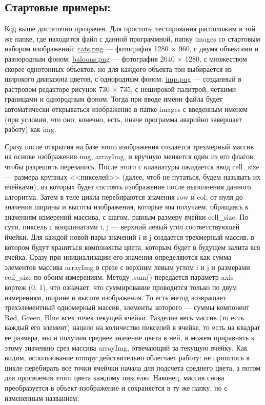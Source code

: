 \documentclass[12pt]{article}
\begin{document}
{	\subsection{Стартовые примеры:}
	\label{base_examples}

	
	
	Код выше достаточно прозрачен. Для простоты тестирования расположим в той же папке, где находится файл с данной программной, папку images со стартовым набором изображений: \hyperref[cats]{cats.png} --- фотография 1280 $\times$ 960, с двумя объектами и разнородным фоном; \hyperref[baloons]{baloons.png} --- фотография 2040 $\times$ 1280, с множеством скорее однотонных объектов, но для каждого объекта тон выбирается из широкого диапазона цветов, с однородным фоном; \hyperref[imp]{imp.png} --- созданный в растровом редакторе рисунок 730 $\times$ 735, с неширокой палитрой, четкими границами и однородным фоном. Тогда при вводе имени файла будет автоматически открываться изображение в папке images с введенным именем (при условии, что оно, конечно, есть, иначе программа аварийно завершает работу) как img.  
	
	Сразу после открытия на базе этого изображения создается трехмерный массив на основе изображения img, arrayImg, и вручную меняется один из его флагов, чтобы разрешить перезапись. После этого с клавиатуры ожидается ввод cell\_size --- размера крупных <<пикселей>> (далее, чтоб не путаться, будем называть их ячейками), из которых будет состоять изображение после выполнения данного алгоритма. Затем в теле цикла перебираются значения row и col, от нуля до значения ширины и высоты изображения, которые мы получаем, обращаясь к значениям измерений массива, с шагом, равным размеру ячейки cell\_size. По сути, пиксель с координатами i, j --- верхний левый угол соответствующей йчейки. Для каждой новой пары значений i и j создается трехмерный массив, в котором будут храниться компоненты цвета, которым будет в будущем залита вся ячейка. Сразу при инициализации его значения определяются как сумма элементов массива arrayImg в срезе с верхним левым углом i и j и размерами cell\_size по обоим измерениям. Методу .sum() передается параметр axis --- кортеж (0, 1), что означает, что суммирование проводится только по двум измерениям, ширине и высоте изображения. То есть метод возвращает трехэлементный одномерный массив, элементы которого --- суммы компонент Red, Green, Blue всех точек текущей ячейки. Разделив весь массив (то есть каждый его элемент) нацело на количество пикселей в ячейке, то есть на квадрат ее размера, мы и получим среднее значение цвета в ней, и можем приравнять к этому значению срез массива arrayImg, отвечающий за текущую ячейку. Как видим, использование numpy действительно облегчает работу: не пришлось в цикле перебирать все точки ячейчки начала для подсчета среднего цвета, а потом для присвоения этого цвета каждому пикселю. Наконец, массив снова преобразуется в объект-изображение и сохраняется в ту же папку, но с измененным названием.
	
}
\end{document}
